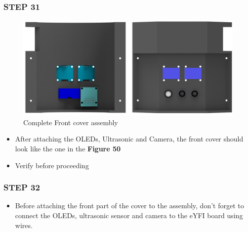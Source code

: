 \documentclass[12pt,a4paper,oneside]{book}
\begin{document}
			\subsubsection*{STEP 31}
				\begin{figure}[H]
					\begin{center}
						\includegraphics[scale=0.6]{FRONT COVER ASSEMBLY}
						\caption{Complete Front cover assembly}
					\end{center}
				\end{figure}
				\begin{itemize}
					\item After attaching the OLEDs, Ultrasonic and Camera, the front cover should look like the one in the \textbf{Figure 50}
					\item Verify before proceeding
				\end{itemize}
			\subsubsection*{STEP 32}
				\begin{itemize}
					\item Before attaching the front part of the cover to the assembly, don't forget to connect the OLEDs, ultrasonic sensor and camera to the eYFI board using wires. 
				\end{itemize}
				
\end{document}

